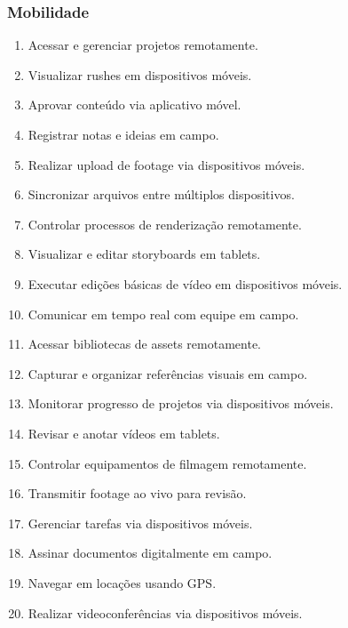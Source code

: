 \subsubsection{Mobilidade}
\begin{enumerate}
 \item Acessar e gerenciar projetos remotamente.
 \item Visualizar rushes em dispositivos móveis.
 \item Aprovar conteúdo via aplicativo móvel.
 \item Registrar notas e ideias em campo.
 \item Realizar upload de footage via dispositivos móveis.
 \item Sincronizar arquivos entre múltiplos dispositivos.
 \item Controlar processos de renderização remotamente.
 \item Visualizar e editar storyboards em tablets.
 \item Executar edições básicas de vídeo em dispositivos móveis.
 \item Comunicar em tempo real com equipe em campo.
 \item Acessar bibliotecas de assets remotamente.
 \item Capturar e organizar referências visuais em campo.
 \item Monitorar progresso de projetos via dispositivos móveis.
 \item Revisar e anotar vídeos em tablets.
 \item Controlar equipamentos de filmagem remotamente.
 \item Transmitir footage ao vivo para revisão.
 \item Gerenciar tarefas via dispositivos móveis.
 \item Assinar documentos digitalmente em campo.
 \item Navegar em locações usando GPS.
 \item Realizar videoconferências via dispositivos móveis.
\end{enumerate}

